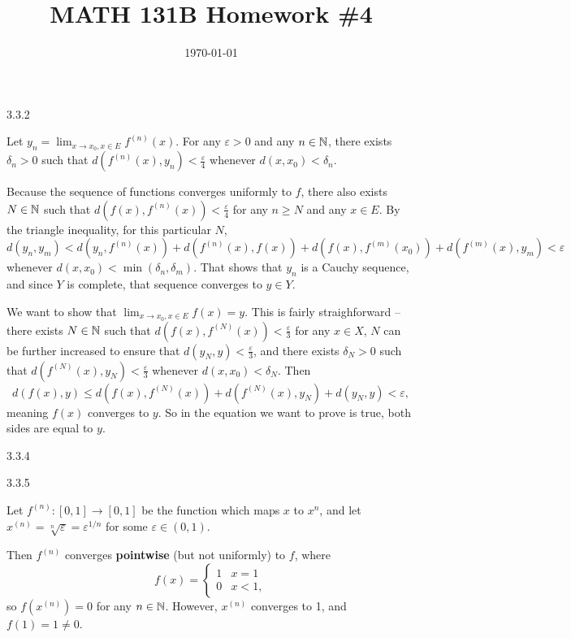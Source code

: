 \documentclass{article}
\date{\today}
\title{MATH 131B Homework \#4}
\begin{document}
\maketitle

\begin{prob}
    3.3.2
\end{prob}
Let $y_n = \lim_{x \rightarrow x_0, x \in E} f^{(n)}(x)$. For any $\varepsilon > 0$ and any $n \in \mathbb{N}$, there exists $\delta_n > 0$ such that $d(f^{(n)}(x), y_n) < \frac{\varepsilon}{4}$ whenever $d(x, x_0) < \delta_n$.
\par
Because the sequence of functions converges uniformly to $f$, there also exists $N \in \mathbb{N}$ such that $d(f(x), f^{(n)}(x)) < \frac{\varepsilon}{4}$ for any $n \geq N$ and any $x \in E$. By the triangle inequality, for this particular $N$,
\[ d(y_n, y_m) < d(y_n, f^{(n)}(x)) + d(f^{(n)}(x), f(x)) + d(f(x), f^{(m)}(x_0)) + d(f^{(m)}(x), y_m) < \varepsilon \]
whenever $d(x, x_0) < \min(\delta_n, \delta_m)$. That shows that $y_n$ is a Cauchy sequence, and since $Y$ is complete, that sequence converges to $y \in Y$.
\par
We want to show that $\lim_{x \rightarrow x_0, x \in E} f(x) = y$. This is fairly straighforward -- there exists $N \in \mathbb{N}$ such that $d(f(x), f^{(N)}(x)) < \frac{\varepsilon}{3}$ for any $x \in X$, $N$ can be further increased to ensure that $d(y_N, y) < \frac{\varepsilon}{3}$, and there exists $\delta_N > 0$ such that $d(f^{(N)}(x), y_N) < \frac{\varepsilon}{3}$ whenever $d(x, x_0) < \delta_N$. Then
\[ d(f(x), y) \leq d(f(x), f^{(N)}(x)) + d(f^{(N)}(x), y_N) + d(y_N, y) < \varepsilon, \]
meaning $f(x)$ converges to $y$. So in the equation we want to prove is true, both sides are equal to $y$.

\bigskip
\begin{prob}
    3.3.4
\end{prob}

\bigskip
\begin{prob}
    3.3.5
\end{prob}
Let $f^{(n)}: [0,1] \rightarrow [0,1]$ be the function which maps $x$ to $x^n$, and let $x^{(n)} = \sqrt[n]{\varepsilon} = \varepsilon^{1/n}$ for some $\varepsilon \in (0, 1)$.
\par
Then $f^{(n)}$ converges \textbf{pointwise} (but not uniformly) to $f$, where
\[ f(x) = \begin{cases}
    1 & x = 1 \\
    0 & x < 1,
\end{cases} \]
so $f(x^{(n)})=0$ for any $n \in \mathbb{N}$. However, $x^{(n)}$ converges to 1, and $f(1)=1\neq 0$.
\end{document}
